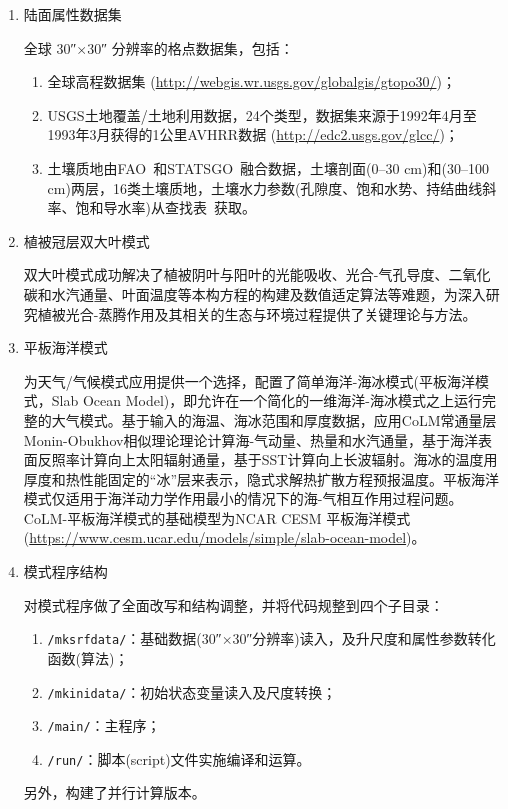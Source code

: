\begin{enumerate}[label={\arabic*)}]
\item 陆面属性数据集

  全球 \ang{;;30}$\times$\ang{;;30} 分辨率的格点数据集，包括：
  \begin{enumerate}[label={\alph*)}]
  \item 全球高程数据集 (\url{http://webgis.wr.usgs.gov/globalgis/gtopo30/})；
  \item USGS土地覆盖/土地利用数据，24个类型，数据集来源于1992年4月至1993年3月获得的1公里AVHRR数据 (\url{http://edc2.usgs.gov/glcc/})；
  \item 土壤质地由FAO~\citep{GlobalSoilData2000}和STATSGO~\citep{Miller1998conterminous}融合数据，土壤剖面(0--30 cm)和(30--100 cm)两层，16类土壤质地，土壤水力参数(孔隙度、饱和水势、持结曲线斜率、饱和导水率)从查找表~\citep{cosby1984statistical}获取。
\end{enumerate}

\item 植被冠层双大叶模式~\citep{dai2004two}

  双大叶模式成功解决了植被阴叶与阳叶的光能吸收、光合-气孔导度、二氧化碳和水汽通量、叶面温度等本构方程的构建及数值适定算法等难题，为深入研究植被光合-蒸腾作用及其相关的生态与环境过程提供了关键理论与方法。

\item 平板海洋模式

  为天气/气候模式应用提供一个选择，配置了简单海洋-海冰模式(平板海洋模式，Slab Ocean Model)，即允许在一个简化的一维海洋-海冰模式之上运行完整的大气模式。基于输入的海温、海冰范围和厚度数据，应用CoLM常通量层Monin-Obukhov相似理论理论计算海-气动量、热量和水汽通量，基于海洋表面反照率计算向上太阳辐射通量，基于SST计算向上长波辐射。海冰的温度用厚度和热性能固定的“冰”层来表示，隐式求解热扩散方程预报温度。平板海洋模式仅适用于海洋动力学作用最小的情况下的海-气相互作用过程问题。CoLM-平板海洋模式的基础模型为NCAR CESM 平板海洋模式 (\url{https://www.cesm.ucar.edu/models/simple/slab-ocean-model})。

\item 模式程序结构

  对模式程序做了全面改写和结构调整，并将代码规整到四个子目录：
  \begin{enumerate}[label={\alph*)}]
  \item \texttt{/mksrfdata/}：基础数据(\ang{;;30}$\times$\ang{;;30}分辨率)读入，及升尺度和属性参数转化函数(算法)；
  \item \texttt{/mkinidata/}：初始状态变量读入及尺度转换；
  \item \texttt{/main/}：主程序；
  \item \texttt{/run/}：脚本(script)文件实施编译和运算。
  \end{enumerate}
另外，构建了并行计算版本。
\end{enumerate}

